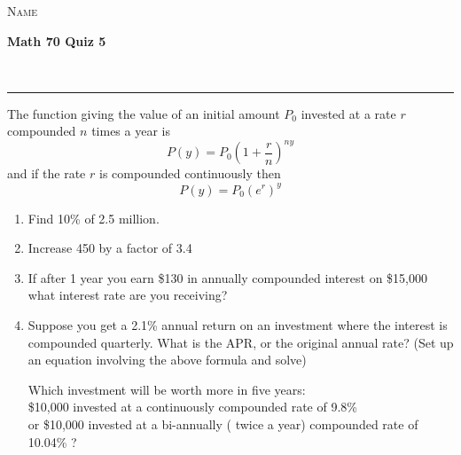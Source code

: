 \documentclass[11pt]{amsart}
\newcommand{\HRule}{\rule{\linewidth}{0.5mm}}
\begin{document}
\begin{minipage}{0.4\textwidth}
\begin{flushleft} \large
 \textsc{Name}
\end{flushleft}
\end{minipage}
\begin{minipage}{0.6\textwidth}
\begin{flushright} \Large
{\bf Math 70 Quiz 5   \\
}
\end{flushright}
\end{minipage}\\

\HRule

\begin{framed}
The function giving the value of an initial amount $P_0$ invested at a rate $r$ 
compounded $n$ times a year is $$P(y) = P_0 \left( 1 + \frac{r}{n} \right)^{ny} $$ 
and if the rate $r$ is compounded continuously then 
$$P(y) = P_0(e^r)^y$$
\end{framed}

\vspace{1cm}

\begin{enumerate}



\item Find 10\% of 2.5 million. \\  \vspace{2cm}

\item Increase 450 by a factor of 3.4\\  \vspace{2cm}
\item If after 1 year you earn \$130 in annually compounded interest on \$15,000 what interest 
rate are you receiving?\\ \vspace{2cm}

\item Suppose you get a 2.1\% annual return on an investment where the interest is compounded
quarterly.   What is the APR, or the original annual rate?   (Set up an equation involving the above
formula and solve) 

\newpage

Which investment will be worth more in five years: \\
\$10,000 invested at a continuously compounded rate of 9.8\% \\
or \$10,000 invested at a bi-annually  ( twice a year) compounded rate of 10.04\% ? 





\end{enumerate}
\end{document}
